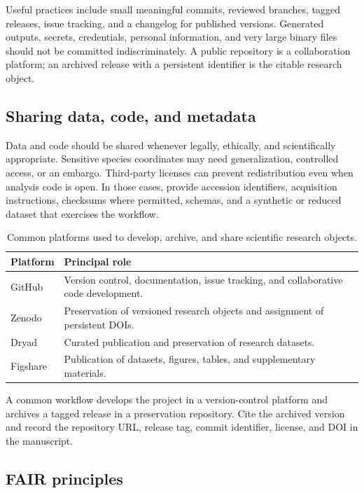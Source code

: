 Useful practices include small meaningful commits, reviewed branches, tagged releases, issue tracking, and a changelog for published versions. Generated outputs, secrets, credentials, personal information, and very large binary files should not be committed indiscriminately. A public repository is a collaboration platform; an archived release with a persistent identifier is the citable research object.

\subsection{Sharing data, code, and metadata}

Data and code should be shared whenever legally, ethically, and scientifically appropriate. Sensitive species coordinates may need generalization, controlled access, or an embargo. Third-party licenses can prevent redistribution even when analysis code is open. In those cases, provide accession identifiers, acquisition instructions, checksums where permitted, schemas, and a synthetic or reduced dataset that exercises the workflow.

\begin{table}[H]
\centering
\caption{Common platforms used to develop, archive, and share scientific research objects.}
\label{tab:repositorios_ciencia_aberta}
\begin{tabular}{p{}p{}}
\toprule
\textbf{Platform} & \textbf{Principal role} \\
\midrule
GitHub & Version control, documentation, issue tracking, and collaborative code development. \\
Zenodo & Preservation of versioned research objects and assignment of persistent DOIs. \\
Dryad & Curated publication and preservation of research datasets. \\
Figshare & Publication of datasets, figures, tables, and supplementary materials. \\
\bottomrule
\end{tabular}
\end{table}

A common workflow develops the project in a version-control platform and archives a tagged release in a preservation repository. Cite the archived version and record the repository URL, release tag, commit identifier, license, and DOI in the manuscript.

\subsection{FAIR principles}

